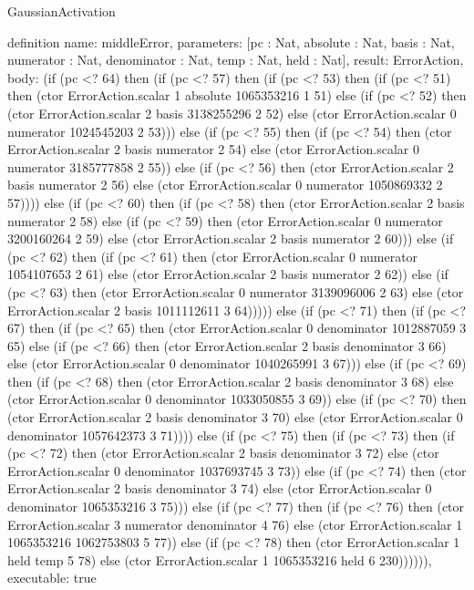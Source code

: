 \begin{lexlean}{GaussianActivation}
\begin{semanticmodule}
definition{
  name: middleError,
  parameters: [pc : Nat, absolute : Nat, basis : Nat, numerator : Nat, denominator : Nat, temp : Nat, held : Nat],
  result: ErrorAction,
  body: (if (pc <? 64) then (if (pc <? 57) then (if (pc <? 53) then (if (pc <? 51) then (ctor ErrorAction.scalar 1 absolute 1065353216 1 51) else (if (pc <? 52) then (ctor ErrorAction.scalar 2 basis 3138255296 2 52) else (ctor ErrorAction.scalar 0 numerator 1024545203 2 53))) else (if (pc <? 55) then (if (pc <? 54) then (ctor ErrorAction.scalar 2 basis numerator 2 54) else (ctor ErrorAction.scalar 0 numerator 3185777858 2 55)) else (if (pc <? 56) then (ctor ErrorAction.scalar 2 basis numerator 2 56) else (ctor ErrorAction.scalar 0 numerator 1050869332 2 57)))) else (if (pc <? 60) then (if (pc <? 58) then (ctor ErrorAction.scalar 2 basis numerator 2 58) else (if (pc <? 59) then (ctor ErrorAction.scalar 0 numerator 3200160264 2 59) else (ctor ErrorAction.scalar 2 basis numerator 2 60))) else (if (pc <? 62) then (if (pc <? 61) then (ctor ErrorAction.scalar 0 numerator 1054107653 2 61) else (ctor ErrorAction.scalar 2 basis numerator 2 62)) else (if (pc <? 63) then (ctor ErrorAction.scalar 0 numerator 3139096006 2 63) else (ctor ErrorAction.scalar 2 basis 1011112611 3 64))))) else (if (pc <? 71) then (if (pc <? 67) then (if (pc <? 65) then (ctor ErrorAction.scalar 0 denominator 1012887059 3 65) else (if (pc <? 66) then (ctor ErrorAction.scalar 2 basis denominator 3 66) else (ctor ErrorAction.scalar 0 denominator 1040265991 3 67))) else (if (pc <? 69) then (if (pc <? 68) then (ctor ErrorAction.scalar 2 basis denominator 3 68) else (ctor ErrorAction.scalar 0 denominator 1033050855 3 69)) else (if (pc <? 70) then (ctor ErrorAction.scalar 2 basis denominator 3 70) else (ctor ErrorAction.scalar 0 denominator 1057642373 3 71)))) else (if (pc <? 75) then (if (pc <? 73) then (if (pc <? 72) then (ctor ErrorAction.scalar 2 basis denominator 3 72) else (ctor ErrorAction.scalar 0 denominator 1037693745 3 73)) else (if (pc <? 74) then (ctor ErrorAction.scalar 2 basis denominator 3 74) else (ctor ErrorAction.scalar 0 denominator 1065353216 3 75))) else (if (pc <? 77) then (if (pc <? 76) then (ctor ErrorAction.scalar 3 numerator denominator 4 76) else (ctor ErrorAction.scalar 1 1065353216 1062753803 5 77)) else (if (pc <? 78) then (ctor ErrorAction.scalar 1 held temp 5 78) else (ctor ErrorAction.scalar 1 1065353216 held 6 230)))))),
  executable: true
}


\end{semanticmodule}
\end{lexlean}
